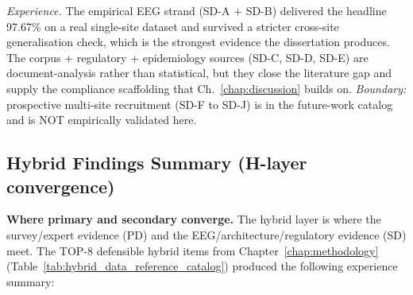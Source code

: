 \vspace{0.5em}\noindent\textit{Experience.} The empirical EEG strand (SD-A + SD-B) delivered the headline 97.67\% on a real single-site dataset and survived a stricter cross-site generalisation check, which is the strongest evidence the dissertation produces. The corpus + regulatory + epidemiology sources (SD-C, SD-D, SD-E) are document-analysis rather than statistical, but they close the literature gap and supply the compliance scaffolding that Ch.~\ref{chap:discussion} builds on. \emph{Boundary:} prospective multi-site recruitment (SD-F to SD-J) is in the future-work catalog and is NOT empirically validated here.

\subsection{Hybrid Findings Summary (H-layer convergence)}
\label{sec:ch4_hybrid_findings_summary}

\noindent\textbf{Where primary and secondary converge.} The hybrid layer is where the survey/expert evidence (PD) and the EEG/architecture/regulatory evidence (SD) meet. The TOP-8 defensible hybrid items from Chapter~\ref{chap:methodology} (Table~\ref{tab:hybrid_data_reference_catalog}) produced the following experience summary:

